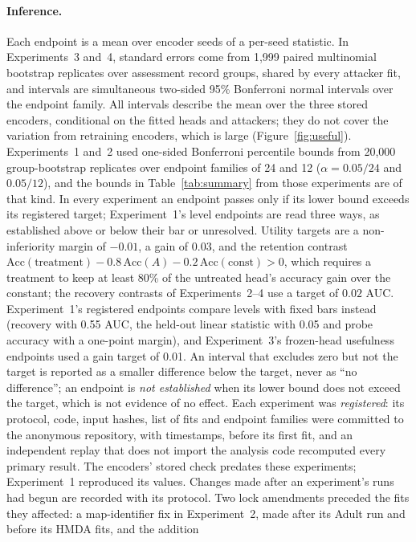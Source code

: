 \documentclass[10pt]{article}
\newcommand{\Acc}{\mathrm{Acc}}
\begin{document}
\paragraph{Inference.} Each endpoint is a mean over encoder seeds of a per-seed statistic. In Experiments~3 and~4,
standard errors come from 1{,}999 paired multinomial bootstrap replicates over assessment record groups, shared by every
attacker fit, and intervals are simultaneous two-sided 95\% Bonferroni normal intervals over the endpoint family. All intervals
describe the mean over the three stored encoders, conditional on the fitted heads and attackers; they do not cover the
variation from retraining encoders, which is large (Figure~\ref{fig:useful}).
Experiments~1 and~2 used one-sided Bonferroni percentile bounds from 20{,}000 group-bootstrap replicates
over endpoint families of 24 and 12 ($\alpha=0.05/24$ and $0.05/12$), and the bounds
in Table~\ref{tab:summary} from those experiments are of that kind. In every experiment an endpoint passes only if its lower bound exceeds its registered target; Experiment~1's level
endpoints are read three ways, as established above or below their bar or unresolved. Utility targets are a non-inferiority margin of $-0.01$, a gain of $0.03$,
and the retention contrast $\Acc(\text{treatment})-0.8\,\Acc(A)-0.2\,\Acc(\text{const})>0$, which requires a treatment to
keep at least 80\% of the untreated head's accuracy gain over the constant; the recovery contrasts of Experiments~2--4 use a target of $0.02$ AUC.
Experiment~1's registered endpoints compare levels with fixed bars instead (recovery with 0.55 AUC, the held-out linear
statistic with 0.05 and probe accuracy with a one-point margin), and Experiment~3's frozen-head usefulness endpoints
used a gain target of 0.01. An interval that excludes zero but not the
target is reported as a smaller difference below the target, never as ``no difference''; an endpoint is \emph{not established} when its lower bound does not exceed the target,
which is not evidence of no effect. Each experiment was \emph{registered}: its protocol, code, input hashes, list of fits and endpoint families were
committed to the anonymous repository, with timestamps, before its first fit, and an independent replay that
does not import the analysis code recomputed every primary result. The encoders' stored check predates these
experiments; Experiment~1 reproduced its values. Changes made after an experiment's runs had begun are recorded with its protocol. Two lock amendments preceded the fits
they affected: a map-identifier fix in Experiment~2, made after its Adult run and before its HMDA fits, and the addition
\end{document}
